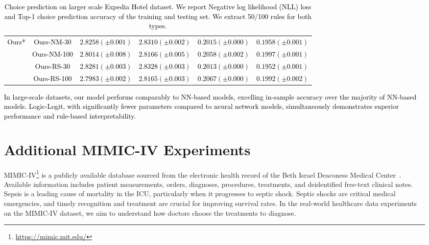 \documentclass{article} %
\begin{document}
\begin{table}[ht]
\begin{tabular}{c|c|c|c|c|c}
\multirow{4}{*}{\textcolor{black}{Ours*}}  
 ~  & \textcolor{black}{Ours-NM-30}  & \textcolor{black}{$2.8258(\pm0.001)$} & \textcolor{black}{$2.8310(\pm0.002)$}  & \textcolor{black}{$0.2015(\pm0.000)$} & \textcolor{black}{$0.1958(\pm0.001)$}  \\
\cline{2-6}
& \textcolor{black}{Ours-NM-100} & \textcolor{black}{$2.8014(\pm0.008)$}
 & \textcolor{black}{$2.8166(\pm0.005)$} &\textcolor{black}{$0.2058(\pm0.002)$} & \textcolor{black}{$0.1997(\pm0.001)$} \\
\cline{2-6}

  ~  & \textcolor{black}{Ours-RS-30}  & \textcolor{black}{$2.8281(\pm0.003)$}
 & \textcolor{black}{$2.8328(\pm0.003)$} & \textcolor{black}{$0.2013(\pm0.000)$}  & \textcolor{black}{$0.1952(\pm0.001)$}\\ 
\cline{2-6}
   ~  & \textcolor{black}{Ours-RS-100}  & \textcolor{black}{$2.7983(\pm0.002)$}
 & \textcolor{black}{$2.8165(\pm0.003)$}& \textcolor{black}{$0.2067(\pm0.000)$} & \textcolor{black}{$0.1992(\pm0.002)$}  \\
 
\bottomrule
\end{tabular}

\caption{\textcolor{black}{Choice prediction on larger scale Expedia Hotel dataset. We report Negative log likelihood (NLL) loss and Top-1 choice prediction accuracy of the training and testing set. We extract 50/100 rules for both types.}}
\label{tab:expedia_results_large_scale}
\end{table}

\textcolor{black}{In large-scale datasets, our model performs comparably to NN-based models, excelling in-sample accuracy over the majority of NN-based models. Logic-Logit, with significantly fewer parameters compared to neural network models, simultaneously demonstrates superior performance and rule-based interpretability.}



\section{Additional MIMIC-IV Experiments} 
\label{appendix:mimic_iv_data}

MIMIC-IV\footnote{\url{https://mimic.mit.edu/}} is a publicly available database sourced from the electronic health record of the Beth Israel Deaconess Medical Center~\citep{johnson2023mimic}. Available information includes patient measurements, orders, diagnoses, procedures, treatments, and deidentified free-text clinical notes. Sepsis is a leading cause of mortality in the ICU, particularly when it progresses to septic shock. Septic shocks are critical medical emergencies, and timely recognition and treatment are crucial for improving survival rates. In the real-world healthcare data experiments on the MIMIC-IV dataset, we aim to understand how doctors choose the treatments to diagnose.
\end{document}

